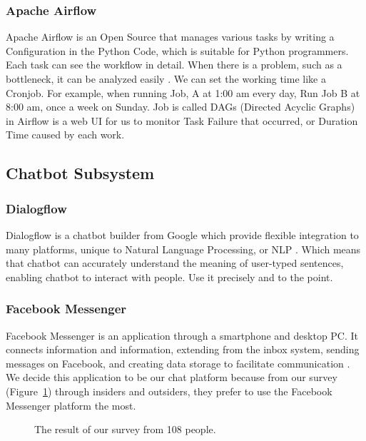 \documentclass[12pt,oneside,openright,a4paper]{cpe-english-project}
\begin{document}
\subsubsection{Apache Airflow}
Apache Airflow is an Open Source that manages various tasks by writing a Configuration in
the Python Code, which is suitable for Python programmers. Each task can see the workflow
in detail. When there is a problem, such as a bottleneck, it can be analyzed easily \cite{apache_airflow}.
We can set the working time like a Cronjob. For example, when running Job, A at 1:00 am
every day, Run Job B at 8:00 am, once a week on Sunday. Job is called DAGs
(Directed Acyclic Graphs) in Airflow is a web UI for us to monitor Task Failure
that occurred, or Duration Time caused by each work.

\subsection{Chatbot Subsystem}
\subsubsection{Dialogflow}
Dialogflow is a chatbot builder from Google which provide flexible integration to many platforms,
unique to Natural Language Processing, or NLP \cite{dialogflow}. Which means that chatbot can
accurately understand the meaning of user-typed sentences, enabling chatbot to interact with people.
Use it precisely and to the point.

\subsubsection{Facebook Messenger}
Facebook Messenger is an application through a smartphone and desktop PC. It connects information
and information, extending from the inbox system, sending messages on Facebook, and creating data
storage to facilitate communication \cite{wiki_fb_messenger}.\\
We decide this application to be our chat platform because from our survey (Figure~\ref*{fig:ch3_result_survey})
through insiders and outsiders, they prefer to use the Facebook Messenger platform the most.

\begin{figure}[h!]
  \centering
  \setlength{\fboxrule}{0.2mm}
  \setlength{\fboxsep}{0.5cm}
  \caption{The result of our survey from 108 people.}
  \label{fig:ch3_result_survey}
\end{figure}
\end{document}
